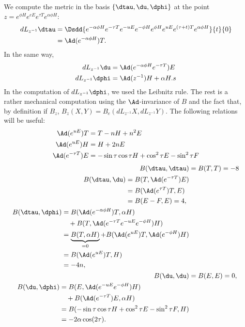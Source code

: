 We compute the metric in the basis $\{\dtau,\du,\dphi\}$ at the point $z=e^{\phi H}e^{eE}e^{\tau T}e^{\alpha\phi H}$:
\begin{equation}
	\begin{aligned}[]
   dL_{z^{-1}}\dtau&=\Dsdd{  e^{-\alpha\phi H}e^{-\tau T}e^{-uE}e^{-\phi H}e^{\phi H}e^{uE}e^{(\tau+t)T}e^{\alpha\phi H}  }{t}{0}\\
             &=\Ad(e^{-\alpha\phi H})T.
	\end{aligned}
\end{equation}
In the same way,
\begin{equation}
	\begin{aligned}[]
  dL_{z^{-1}}\du&=\Ad(e^{-\alpha\phi H}e^{-\tau T})E\\
  dL_{z^{-1}}\dphi&=\Ad(z^{-1})H+\alpha H.s
	\end{aligned}
\end{equation}
In the computation of $dL_{z^{-1}}\dphi$, we used the Leibnitz rule. The rest is a rather mechanical computation using the $\Ad$-invariance of $B$ and the fact that, by definition if $B_z$, $B_z(X,Y)=B_e(dL_{z^{-1}}X,dL_{z^{-1}}Y)$. The following relations will be useful:
\begin{subequations}
\begin{align}
  \Ad(e^{uE})T&=T-nH+n^2E\\
  \Ad(e^{uE})H&=H+2nE\\
  \Ad(e^{-\tau T})E&=-\sin\tau\cos\tau H+\cos^2\tau E-\sin^2\tau F
\end{align}
\end{subequations}
\begin{align}
  B(\dtau,\dtau)&=B(T,T)=-8\\
\begin{split}
  B(\dtau,\du)  &=B(T,\Ad(e^{-\tau T})E)\\
                &=B(\Ad(e^{\tau T})T,E)\\
		&=B(E-F,E)=4,
\end{split}\\
\begin{split}
     B(\dtau,\dphi)&=B(\Ad(e^{-\alpha\phi H})T,\alpha H)\\
                     &\quad +B(T, \Ad(e^{-\tau T}e^{-uE}e^{-\phi H})H  )\\
		   &=\underbrace{B(T,\alpha H)}_{=0}+B( \Ad(e^{uE})T,\Ad(e^{-\phi H})H )\\
		   &=B(\Ad(e^{uE})T,H)\\
		   &=-4n,
\end{split}\\
  B(\du,\du)&=B(E,E)=0,\\
\begin{split}
  B(\du,\dphi)&=B(  E,\Ad(e^{-uE}e^{-\phi H})H )\\
              &\quad+B( \Ad(e^{-\tau T})E,\alpha H )\\
	      &=B(-\sin\tau\cos\tau H+\cos^2\tau E-\sin^2\tau F,H)\\
	      &=-2\alpha\cos(2\tau).
\end{split}
 \end{align}

